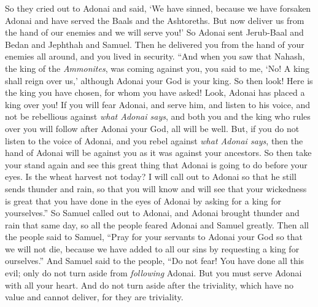 \begin{biblechapter}
\verse So they cried out to Adonai and said, ‘We have sinned, because we have forsaken Adonai and have served the Baals and the Ashtoreths. But now deliver us from the hand of our enemies and we will serve you!’
\verse So Adonai sent Jerub-Baal and Bedan and Jephthah and Samuel. Then he delivered you from the hand of your enemies all around, and you lived in security.
\verse “And when you saw that Nahash, the king of the \textit{Ammonites}, was coming against you, you said to me, ‘No! A king shall reign over us,’ although Adonai your God is your king.
\verse So then look! Here is the king you have chosen, for whom you have asked! Look, Adonai has placed a king over you!
\verse If you will fear Adonai, and serve him, and listen to his voice, and not be rebellious against \textit{what Adonai says}, and both you and the king who rules over you will follow after Adonai your God, all will be well.
\verse But, if you do not listen to the voice of Adonai, and you rebel against \textit{what Adonai says}, then the hand of Adonai will be against you as it was against your ancestors.
\verse So then take your stand again and see this great thing that Adonai is going to do before your eyes.
\verse Is the wheat harvest not today? I will call out to Adonai so that he still sends thunder and rain, so that you will know and will see that your wickedness is great that you have done in the eyes of Adonai by asking for a king for yourselves.”
\verse So Samuel called out to Adonai, and Adonai brought thunder and rain that same day, so all the people feared Adonai and Samuel greatly.
\verse Then all the people said to Samuel, “Pray for your servants to Adonai your God so that we will not die, because we have added to all our sins by requesting a king for ourselves.”
\verse And Samuel said to the people, “Do not fear! You have done all this evil; only do not turn aside from \textit{following} Adonai. But you must serve Adonai with all your heart.
\verse And do not turn aside after the triviality, which have no value and cannot deliver, for they are triviality.

\end{biblechapter}
